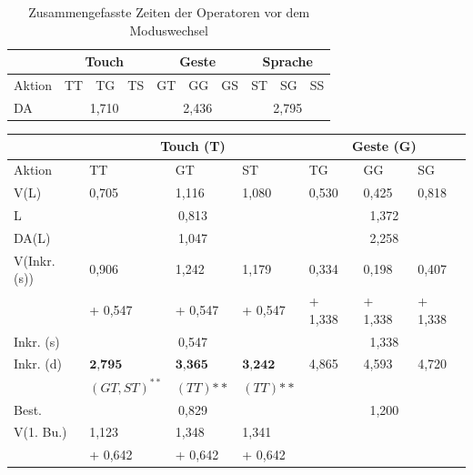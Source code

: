 \begin{table}[ht]
  \centering
	\begin{tabular}{|l|l|l|l|l|l|l|l|l|l|}
		\hline
		& \multicolumn{3}{|c|}{Touch} & \multicolumn{3}{|c|}{Geste}&\multicolumn{3}{|c|}{Sprache}\\
		\hline
		Aktion 					& TT 		& TG 		& TS 		& GT 		& GG 		& GS 		& ST 		& SG 		& SS\\
		\hline
		DA 	& \multicolumn{3}{|c|}{1,710} &	\multicolumn{3}{|c|}{2,436} 	&	\multicolumn{3}{|c|}{2,795} \\
		\hline			
  \end{tabular}
	\caption{Zusammengefasste Zeiten der Operatoren vor dem Moduswechsel}
\label{tab:OperatorzeitenZusammengefasst1}
\end{table}
\begin{table}[ht]
  \centering
	\begin{tabular}{|l|l|l|l|l|l|l|}
		\hline
		& \multicolumn{3}{|c|}{Touch (T)} & \multicolumn{3}{|c|}{Geste (G)}\\
		\hline
		Aktion 					& TT 	& GT 	& ST 	& TG 	& GG 	& SG \\
		\hline
		V(L)	& {0,705} 	& {1,116}		& {1,080} 	&	{0,530}		&	{0,425}		&	{0,818}\\
		\hline
		L					& \multicolumn{3}{|c|}{0,813} &	\multicolumn{3}{|c|}{1,372}\\
		\hline
		DA(L)			& \multicolumn{3}{|c|}{1,047} &	\multicolumn{3}{|c|}{2,258}\\
		\hline
		V(Inkr. (s))
										& {0,906} 	& {1,242}		& {1,179} 	&	{0,334}		&	{0,198}		&	{0,407}\\
										& \small{+ 0,547} 	& \small{+ 0,547}	& \tiny{+ 0,547} 	&	\small{+ 1,338}	&	\tiny{+ 1,338}	&	\small{+ 1,338}\\
		\hline
		Inkr. (s)				& \multicolumn{3}{|c|}{0,547} &	\multicolumn{3}{|c|}{1,338}\\
		\hline
		Inkr. (d)				& $\textbf{2,795}$ & $\textbf{3,365}$	& $\textbf{3,242}$ &	4,865	&	4,593	&	4,720	\\		
									& \small{$(GT,ST)^{**}$} & \small{$(TT){**}$}	& \small{$(TT){**}$}  &	&	&		 \\	
		\hline		
		Best. 				& \multicolumn{3}{|c|}{0,829} &	\multicolumn{3}{|c|}{1,200}\\			
		\hline
		V(1. Bu.)
										& {1,123} 	& {1,348}		& {1,341} 	&				& 			&  	\\
										& \small{+ 0,642} & \small{+ 0,642}	& \small{+ 0,642} &				& 			&  		\\

\end{tabular}
\end{table}
